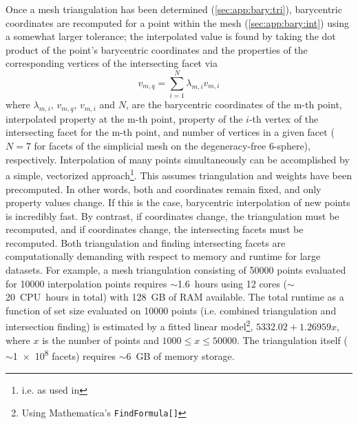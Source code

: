 \documentclass[final,12pt]{elsarticle}
\begin{document}
Once a mesh triangulation has been determined (\cref{sec:app:bary:tri}), barycentric coordinates are recomputed for a \outpt{} point within the \inpt{} mesh (\cref{sec:app:bary:int}) using a somewhat larger tolerance; the interpolated value is found by taking the dot product of the \outpt{} point's barycentric coordinates and the properties of the corresponding vertices of the intersecting facet via
\begin{equation}
	\label{eq:bary-interp}
	v_{m,q}=\underset{i=1}{\overset{N}{\sum }}\lambda _{m,i} v_{m,i}
\end{equation}
where $\lambda_{m,i}$, $v_{m,q}$, $v_{m,i}$ and $N$, are the barycentric coordinates of the m-th \outpt{} point, interpolated property at the m-th \outpt{} point, property of the $i$-th vertex of the intersecting facet for the m-th \outpt{} point, and number of vertices in a given facet ($N = 7$ for facets of the simplicial mesh on the degeneracy-free 6-sphere), respectively. Interpolation of many \outpt{} points simultaneously can be accomplished by a simple, vectorized approach\footnote{i.e.  as used in }. This assumes triangulation and weights have been precomputed. In other words, both \inpt{} and \outpt{} coordinates remain fixed, and only \inpt{} property values change. If this is the case, barycentric interpolation of new points is incredibly fast. By contrast, if \inpt{} coordinates change, the triangulation must be recomputed, and if \outpt{} coordinates change, the intersecting facets must be recomputed. Both triangulation and finding intersecting facets are computationally demanding with respect to memory and runtime for large datasets. For example, a mesh triangulation consisting of \num{50000} points evaluated for \num{10000} interpolation points requires $\sim$1.6~hours using 12 cores ($\sim$20~CPU~hours in total) with \num{128}~GB of RAM available. The total runtime as a function of set size evaluated on \num{10000} \outpt{} points (i.e. combined triangulation and intersection finding) is estimated by a fitted linear model\footnote{Using Mathematica's \texttt{FindFormula[]} }, $5332.02 + 1.26959 x$, where $x$ is the number of points and $1000\leq x \leq 50000$. The triangulation itself ($\sim$\num{1e8} facets) requires $\sim$6~GB of memory storage.
\end{document}
